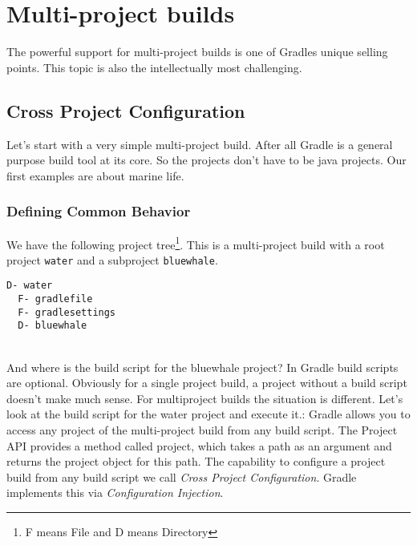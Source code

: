 \chapter{Multi-project builds} %
\label{cha:multi_project_builds}

The powerful support for multi-project builds is one of Gradles unique selling points. This topic is also the intellectually most challenging.
\section{Cross Project Configuration} %
\label{sec:cross_project_configuration}
Let's start with a very simple multi-project build. After all Gradle is a general purpose build tool at its core. So the projects don't have to be java projects. Our first examples are about marine life. 

\subsection{Defining Common Behavior} %
\label{sub:defining_common_behavior}
We have the following project tree\footnote{F means File and D means Directory}. This is a multi-project build with a root project \texttt{water} and a subproject \texttt{bluewhale}.

\begin{minipage}[t]{7cm}
\begin{Verbatim}[frame=single,label=Project Tree]
D- water
  F- gradlefile
  F- gradlesettings
  D- bluewhale	
\end{Verbatim}
\end{minipage}	
\begin{minipage}[t]{9cm}
\end{minipage}
\\

\noindent And where is the build script for the bluewhale project? In Gradle build scripts are optional. Obviously for a single project build, a project without a build script doesn't make much sense. For multiproject builds the situation is different. Let's look at the build script for the water project and execute it.:
Gradle allows you to access any project of the multi-project build from any build script. The Project API provides a method called project, which takes a path as an argument and returns the project object for this path. The capability to configure a project build from any build script we call \emph{Cross Project Configuration}. Gradle implements this via \emph{Configuration Injection}.

